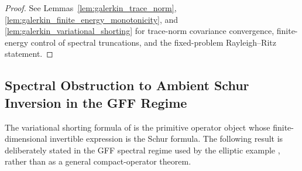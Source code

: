 \documentclass[preprint,12pt]{elsarticle}
\theoremstyle{plain}
\theoremstyle{definition}
\theoremstyle{remark}
\begin{document}
    \begin{proof}
        See Lemmas~\ref{lem:galerkin_trace_norm},
        \ref{lem:galerkin_finite_energy_monotonicity}, and
        \ref{lem:galerkin_variational_shorting} for trace-norm covariance
        convergence, finite-energy control of spectral truncations, and the
        fixed-problem Rayleigh--Ritz statement.
    \end{proof}

    \subsection{Spectral Obstruction to Ambient Schur Inversion in the GFF Regime}
    \label{sec:triple_impossibility}

    The variational shorting formula of  is the
    primitive operator object whose finite-dimensional invertible expression is
    the Schur formula.  The following result is deliberately stated in the GFF
    spectral regime used by the elliptic example \cite{sheffield2007gaussian,henderson2022sobolev}, rather than as a general
    compact-operator theorem.
\end{document}
